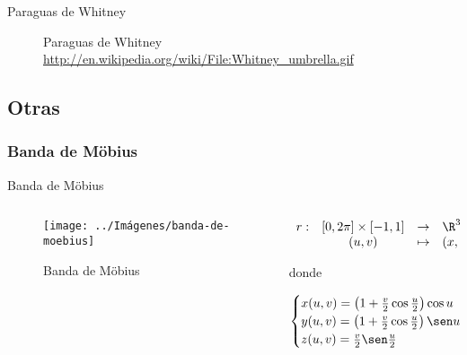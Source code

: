 \documentclass[10pt]{beamer}
\begin{document}
	\begin{frame}{Paraguas de Whitney}
	\begin{figure}
		\centering
		\caption{Paraguas de Whitney \url{http://en.wikipedia.org/wiki/File:Whitney_umbrella.gif}}
		\label{fig:paraguas-de-Whitney-gif}
	\end{figure}
		
	\end{frame}
	
	\subsection{Otras}
	
	\subsubsection{Banda de Möbius}
	
	\begin{frame}{Banda de Möbius}
		\begin{columns}[t] %
			\begin{column}{.50\textwidth}
				\begin{figure}
					\centering
					\texttt{[image: ../Imágenes/banda-de-moebius]}
					\caption{Banda de Möbius}
					\label{fig:banda-de-moebius}
				\end{figure}
			\end{column}%
			\hfill%
			\begin{column}{.50\textwidth}
				$$\begin{array}{rcll}
				r : & [0, 2\pi] \times [-1,1] & \to & \R^3\\
				& (u,v) & \mapsto & (x,y,z)
				\end{array}$$
				
				donde 
				
				$$ \begin{cases}
				x(u,v) = \left( 1 + \frac{v}{2}\cos\frac{u}{2} \right)\cos u \\
				y(u,v) = \left( 1 + \frac{v}{2}\cos\frac{u}{2} \right)\sen u \\
				z(u,v) = \frac{v}{2}\sen\frac{u}{2}
				\end{cases} $$
			\end{column}%
		\end{columns}
	\end{frame}
	
\end{document}

